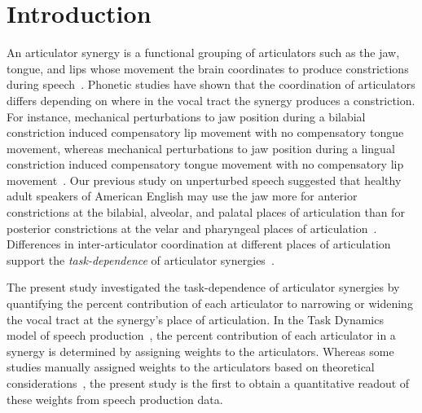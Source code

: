 \documentclass[preprint]{JASAnew}
\begin{document}
\maketitle


\section{Introduction}

An articulator synergy is a functional grouping of articulators such as the jaw, tongue, and lips whose movement the brain coordinates to produce constrictions during speech~\cite{turvey1977preliminaries}. 
%
Phonetic studies have shown that the coordination of articulators differs depending on where in the vocal tract the synergy produces a constriction. 
%
For instance, mechanical perturbations to jaw position during a bilabial constriction induced compensatory lip movement with no compensatory tongue movement, 
%
whereas mechanical perturbations to jaw position during a lingual constriction induced compensatory tongue movement with no compensatory lip movement~\citep{kelso1984functionally}. 
%
Our previous study on unperturbed speech suggested that healthy adult speakers of American English may use the jaw more for anterior constrictions at the bilabial, alveolar, and palatal places of articulation than for posterior constrictions at the velar and pharyngeal places of articulation~\citep{Sorensen+2016}. 
%
Differences in inter-articulator coordination at different places of articulation support the \textit{task-dependence} of articulator synergies~\citep{latash2008synergy}. 

The present study investigated the task-dependence of articulator synergies by quantifying the percent contribution of each articulator to narrowing or widening the vocal tract at the synergy's place of articulation. 
%
In the Task Dynamics model of speech production~\citep{saltzman1989dynamical}, the percent contribution of each articulator in a synergy is determined by assigning weights to the articulators. 
%
Whereas some studies manually assigned weights to the articulators based on theoretical considerations~\citep[for example, see][for an assignment of weights based on articulator mass]{simko2010embodied}, the present study is the first to obtain a quantitative readout of these weights from speech production data. 
\end{document}
